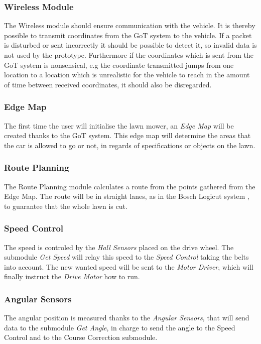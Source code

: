 \subsubsection{Wireless Module}
The Wireless module should ensure communication with the vehicle. It is thereby possible to transmit coordinates from the GoT system to the vehicle. If a packet is disturbed or sent incorrectly it should be possible to detect it, so invalid data is not used by the prototype. Furthermore if the coordinates which is sent from the GoT system is nonsensical, e.g the coordinate transmitted jumps from one location to a location which is unrealistic for the vehicle to reach in the amount of time between received coordinates, it should also be disregarded.

\subsubsection{Edge Map}
The first time the user will initialise the lawn mower, an \textit{Edge Map} will be created thanks to the GoT system. This edge map will determine the areas that the car is allowed to go or not, in regards of specifications or objects on the lawn.  

\subsubsection{Route Planning}
The Route Planning module calculates a route from the points gathered from the Edge Map. The route will be in straight lanes, as in the Bosch Logicut system , to guarantee that the whole lawn is cut. 

\subsubsection{Speed Control}
The speed is controled by the \textit{Hall Sensors} placed on the drive wheel. The submodule \textit{Get Speed} will relay this speed to the \textit{Speed Control} taking the belts into account. The new wanted speed will be sent to the \textit{Motor Driver}, which will finally instruct the \textit{Drive Motor} how to run.


\subsubsection{Angular Sensors}
The angular position is measured thanks to the \textit{Angular Sensors}, that will send data to the submodule \textit{Get Angle}, in charge to send the angle to the Speed Control and to the Course Correction submodule.

